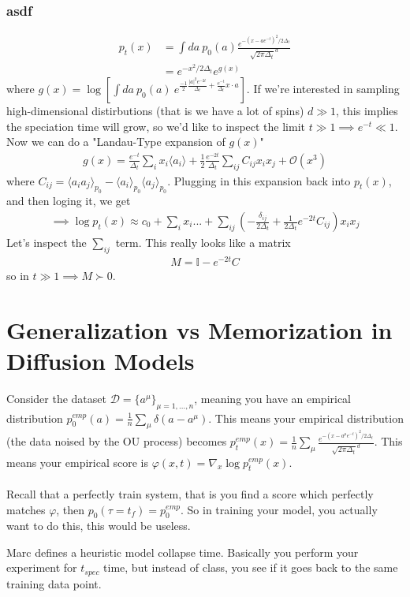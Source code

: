 \subsubsection{asdf}
\begin{align}
	p_t(x) &  = \int da~ p_0(a) \frac{e^{-(x - ae^{-t})^2/2\Delta_t}}{\sqrt{2\pi \Delta_t}^d}\\
	& =  e^{-x^2/2\Delta_t}  e^{g(x)}
\end{align}
where $g(x) = \log \left [\int da ~ p_0(a) ~ e^{\frac{-1}{2} \frac{|a|^2 e^{-2t}}{\Delta_t} + \frac{e^{-t}}{\Delta_t} x\cdot a} \right]$. If we're interested in sampling high-dimensional distirbutions (that is we have a lot of spins) $d \gg 1$, this implies the speciation time will grow, so we'd like to inspect the limit $t \gg 1 \implies e^{-t} \ll 1$. Now we can do a "Landau-Type expansion of $g(x)$"
\begin{align}
	g(x) = \frac{e^{-t}}{\Delta_t} \sum_i x_i \langle a_i\rangle + \frac{1}{2} \frac{e^{-2t}}{\Delta_t} \sum_{ij} C_{ij} x_i x_j + \mathcal O(x^3)
\end{align}
where $C_{ij} = \langle a_i a_j \rangle_{p_0} - \langle a_i \rangle_{p_0} \langle a_j \rangle_{p_0}$. Plugging in this expansion back into $p_t(x)$, and then loging it, we get
\begin{align}
	\implies \log p_t(x) \approx c_0 + \sum_i x_i ... + \sum_{ij} \left ( - \frac{\delta_{ij}}{2 \Delta_t} + \frac{1}{2 \Delta_t} e^{-2t} C_{ij}\right) x_i x_j
\end{align}
Let's inspect the $\sum_{ij}$ term. This really looks like a matrix
\begin{align}
	M = \mathbb I - e^{-2t} C
\end{align}
so in $t \gg 1 \implies M \succ 0$. 

\section{Generalization vs Memorization in Diffusion Models}
Consider the dataset $\mathcal D = \{a^\mu\}_{\mu = 1, ... ,n}$, meaning you have an empirical distribution $p_0^{emp}(a) = \frac{1}{n} \sum_\mu \delta(a - a^\mu)$. This means your empirical distribution (the data noised by the OU process) becomes $p_t^{emp}(x) = \frac{1}{n} \sum_\mu \frac{e^{-(x - a^\mu e^{-t})^2/2\Delta_t}}{\sqrt{2\pi \Delta_t}^d}$. This means your empirical score is $\varphi(x,t) = \nabla_x \log p_t^{emp}(x)$. \\
\\
Recall that a perfectly train system, that is you find a score which perfectly matches $\varphi$, then $p_0(\tau =t_f) = p_0^{emp}$. So in training your model, you actually want to do this, this would be useless.
\begin{definition}
	 Marc defines a heuristic model collapse time. Basically you perform your experiment for $t_{spec}$ time, but instead of class, you see if it goes back to the same training data point.
\end{definition}
